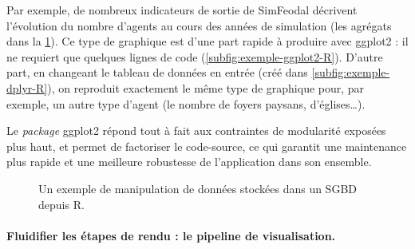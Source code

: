 Par exemple, de nombreux indicateurs de sortie de SimFeodal décrivent l'évolution du nombre d'agents au cours des années de simulation (les agrégats dans la \cref{fig:exemple-ggplot2-simedb}).
Ce type de graphique est d'une part rapide à produire avec \textsf{ggplot2} : il ne requiert que quelques lignes de code (\cref{subfig:exemple-ggplot2-R}).
D'autre part, en changeant le tableau de données en entrée (créé dans \cref{subfig:exemple-dplyr-R}), on reproduit exactement le même type de graphique pour, par exemple, un autre type d'agent (le nombre de foyers paysans, d'églises\ldots).

Le \textit{package} \textsf{ggplot2} répond tout à fait aux contraintes de modularité exposées plus haut, et permet de factoriser le code-source, ce qui garantit une maintenance plus rapide et une meilleure robustesse de l'application dans son ensemble.


\begin{figure}[H]
	\centering
	\hspace{5pt}
	\hspace{5pt}
	\caption{Un exemple de manipulation de données stockées dans un SGBD depuis R.}
	\label{fig:exemple-ggplot2-simedb}
\end{figure}

\paragraph{Fluidifier les étapes de rendu : le \og pipeline de visualisation\fg{}.}\label{par:visualisation-pipeline}

